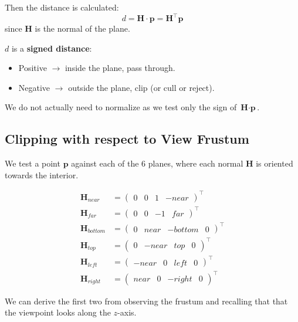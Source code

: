 \documentclass[11pt]{article}
\begin{document}
Then the distance is calculated:
\[
  d = \textbf{H} \cdot \textbf{p} = \textbf{H}^\intercal \textbf{p} 
\]
since $\textbf{H}$ is the normal of the plane.

$d$ is a \textbf{signed distance}:
\begin{itemize}
  \item Positive $\rightarrow$ inside the plane, pass through.
  \item Negative $\rightarrow$ outside the plane, clip (or cull or reject).
\end{itemize}

We do not actually need to normalize as we test only the sign of $\textbf{H} \cdot \textbf{p}$.

\subsection{Clipping with respect to View Frustum}
We test a point $\textbf{p}$ against each of the 6 planes, where each normal $\textbf{H}$ is oriented towards the interior.

\begin{align*}
  \textbf{H}_{near} &= \begin{pmatrix} 0 & 0 & 1 & -near \end{pmatrix}^\intercal \\
  \textbf{H}_{far} &= \begin{pmatrix} 0 & 0 & -1 & far \end{pmatrix}^\intercal \\
  \textbf{H}_{bottom} &= \begin{pmatrix} 0 &  near & -bottom & 0 \end{pmatrix}^\intercal \\
  \textbf{H}_{top} &= \begin{pmatrix} 0 & -near & top & 0 \end{pmatrix}^\intercal \\
  \textbf{H}_{left} &= \begin{pmatrix} -near  & 0 & left & 0 \end{pmatrix}^\intercal \\
  \textbf{H}_{right} &= \begin{pmatrix} near & 0 & -right & 0 \end{pmatrix}^\intercal
\end{align*}

We can derive the first two from observing the frustum and recalling that that the viewpoint looks along the $z$-axis.
\end{document}
